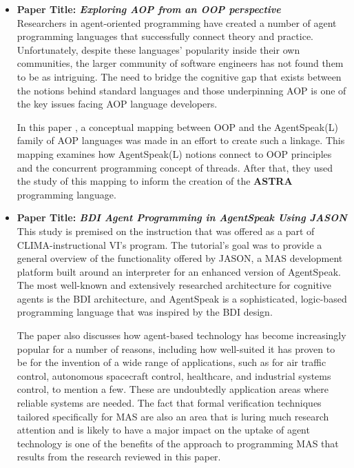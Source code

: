 \begin{itemize}[label={}]
\item \textbf{Paper Title: \textit{Exploring \ac{AOP} from an \ac{OOP} perspective}}\\

Researchers in agent-oriented programming have created a number of agent programming languages that successfully connect theory and practice. Unfortunately, despite these languages' popularity inside their own communities, the larger community of software engineers has not found them to be as intriguing. The need to bridge the cognitive gap that exists between the notions behind standard languages and those underpinning \ac{AOP} is one of the key issues facing \ac{AOP} language developers. 
 
 \vspace{.5cm}
 
In this paper \cite{astra}, a conceptual mapping between \ac{OOP} and the AgentSpeak(L) family of \ac{AOP} languages was made in an effort to create such a linkage. This mapping examines how AgentSpeak(L) notions connect to \ac{OOP} principles and the concurrent programming concept of threads. After that, they used the study of this mapping to inform the creation of the \textbf{\ac{ASTRA}} programming language.

 \vspace{.5cm}
 
\item \textbf{Paper Title: \textit{\ac{BDI} Agent Programming in AgentSpeak Using JASON}} \\

This study \cite{jasonBDI} is premised on the instruction that was offered as a part of CLIMA-instructional VI's program. The tutorial's goal was to provide a general overview of the functionality offered by JASON, a \ac{MAS} development platform built around an interpreter for an enhanced version of AgentSpeak. The most well-known and extensively researched architecture for cognitive agents is the \ac{BDI} architecture, and AgentSpeak is a sophisticated, logic-based programming language that was inspired by the \ac{BDI} design.

\vspace{.5cm}

The paper also discusses how agent-based technology has become increasingly popular for a number of reasons, including how well-suited it has proven to be for the invention of a wide range of applications, such as for air traffic control, autonomous spacecraft control, healthcare, and industrial systems control, to mention a few. These are undoubtedly application areas where reliable systems are needed. The fact that formal verification techniques tailored specifically for \ac{MAS} are also an area that is luring much research attention and is likely to have a major impact on the uptake of agent technology is one of the benefits of the approach to programming \ac{MAS} that results from the research reviewed in this paper.


\end{itemize}
